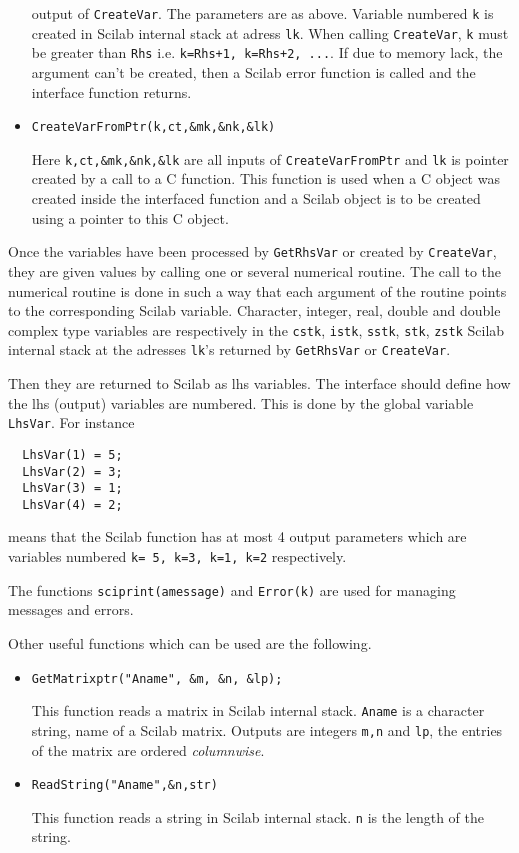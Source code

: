 \begin{itemize}
{output of \verb!CreateVar!. The parameters are as above. Variable numbered
\verb!k! is created in Scilab internal stack at adress {\tt lk}. When
calling {\tt CreateVar}, {\tt k} must be greater than {\tt Rhs} i.e.
{\tt k=Rhs+1, k=Rhs+2, ...}.
If due to memory lack, the argument can't be created, then a Scilab error 
function is called and the interface function returns.
}
\item{
\begin{verbatim}
CreateVarFromPtr(k,ct,&mk,&nk,&lk)
\end{verbatim}
Here \verb!k,ct,&mk,&nk,&lk! are all inputs of \verb!CreateVarFromPtr! and
\verb!lk! is pointer created by a call to a C function. This function is used 
when a C object was created inside the interfaced function and a Scilab 
object is to be created using a pointer to this C object. }
\end{itemize}


Once the  variables have been processed by {\tt GetRhsVar} or created
by {\tt CreateVar}, they are given values by calling one or several 
numerical routine. The call to the numerical routine is done
in such a way that each argument of the routine points to the
corresponding Scilab variable. 
Character, integer, real, double and double complex type variables are 
respectively in the {\tt cstk}, {\tt istk}, {\tt sstk}, 
{\tt stk}, {\tt zstk} Scilab internal stack
at the adresses {\tt lk}'s returned by {\tt GetRhsVar} or {\tt CreateVar}. 

Then they are returned to Scilab as lhs variables.
The interface should define how the lhs (output) variables are
numbered. This is done by the global variable {\tt LhsVar}.
For instance
\begin{verbatim}
  LhsVar(1) = 5;
  LhsVar(2) = 3;
  LhsVar(3) = 1;
  LhsVar(4) = 2;
\end{verbatim}
means that the Scilab function has at most 4 output parameters
which are variables numbered \verb!k= 5, k=3, k=1, k=2! respectively.

The functions \verb!sciprint(amessage)! and \verb!Error(k)! are used
for managing messages and errors.

Other useful functions which can be used are the following.
\begin{itemize}
\item{
\begin{verbatim}
GetMatrixptr("Aname", &m, &n, &lp);
\end{verbatim}
This function reads a matrix in Scilab internal stack. \verb!Aname! is
a character string, name of a Scilab matrix. Outputs are integers
\verb!m,n! and \verb!lp!, the entries of the matrix are 
ordered {\em columnwise}.}
\item{
\begin{verbatim}
ReadString("Aname",&n,str)
\end{verbatim}
This function reads a string in Scilab internal stack. \verb!n! is the
length of the string.
}
\end{itemize}


